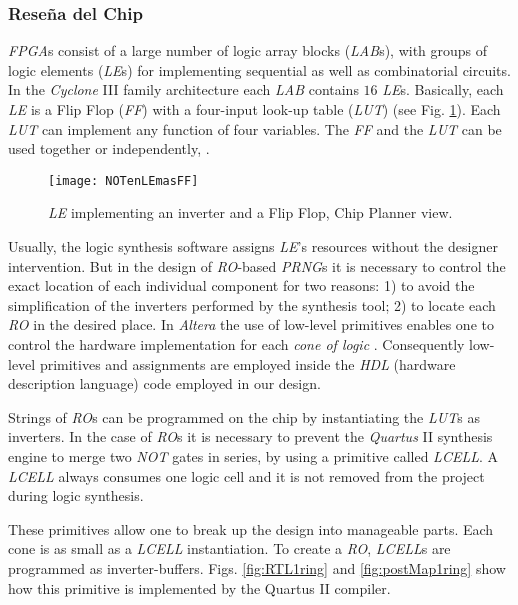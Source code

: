 \subsubsection{Reseña del Chip}

\emph{FPGA}s consist of a large number of logic array blocks (\emph{LAB}s), with groups of logic elements (\emph{LE}s) for implementing sequential as well as
combinatorial circuits. In the \emph{Cyclone} III family architecture
each \emph{LAB} contains $16$ \emph{LE}s.
Basically, each \emph{LE} is a Flip Flop (\emph{FF}) with a
four-input look-up table (\emph{LUT})  (see Fig. \ref{fig:LE}). Each
\emph{LUT} can implement any function of
four variables. The \emph{FF} and the \emph{LUT} can be used together or independently, \cite{Altera}.

\begin{figure}
\begin{center}
\texttt{[image: NOTenLEmasFF]}
\caption{\emph{LE} implementing an inverter and a Flip Flop, Chip Planner
view.} \label{fig:LE}
\end{center}
\end{figure}

Usually, the logic synthesis software assigns \emph{LE}'s
resources without the designer intervention. But in the design of
\emph{RO}-based \emph{PRNG}s it is necessary to control the exact location of
each individual component for two reasons: 1) to avoid the
simplification of the inverters performed by the synthesis tool; 2) to locate
each \emph{RO} in the desired place. In \emph{Altera} the use of low-level primitives enables one to
control the hardware implementation for each \emph{cone of logic} \cite{LowLevel}. Consequently
low-level primitives and assignments are employed inside the \emph{HDL} (hardware description language) code employed in our design.

Strings of \emph{RO}s can be programmed on the chip by
instantiating the \emph{LUT}s as inverters.
In the case of \emph{RO}s it is necessary to prevent the \emph{Quartus} II synthesis engine to merge two \emph{NOT} gates in series, by using a primitive called \emph{LCELL}.
 A \emph{LCELL} always consumes one logic cell and it is not
removed from the project during logic synthesis.

These primitives allow one to break up the design into manageable parts. Each cone is as small as a \emph{LCELL} instantiation.
To create a \emph{RO}, \emph{LCELL}s are programmed as inverter-buffers. Figs. \ref{fig:RTL1ring} and \ref{fig:postMap1ring} show how this primitive is implemented by the Quartus II compiler.

